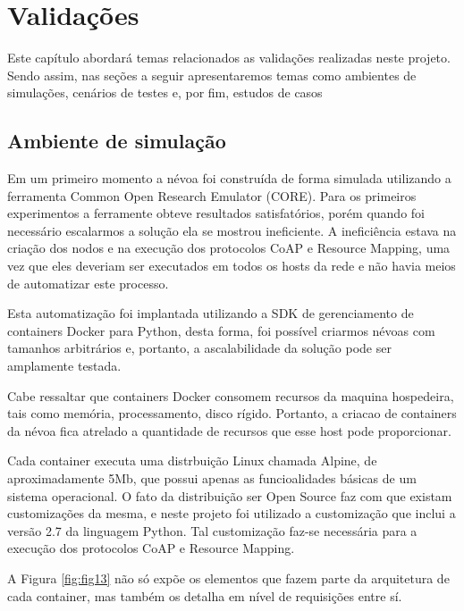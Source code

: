 \chapter{\label{chap:chap4} Validações}

Este capítulo abordará temas relacionados as validações realizadas neste projeto.
Sendo assim, nas seções a seguir apresentaremos temas como ambientes de simulações, cenários de testes e, por fim, estudos de casos


\section{Ambiente de simulação}
Em um primeiro momento a névoa foi construída de forma simulada utilizando a ferramenta Common Open Research Emulator (CORE)\cite{coregui}.
Para os primeiros experimentos a ferramente obteve resultados satisfatórios, porém quando foi necessário escalarmos a solução ela se mostrou ineficiente.
A ineficiência estava na criação dos nodos e na execução dos protocolos CoAP e Resource Mapping, uma vez que eles deveriam ser executados em todos os hosts da rede e não havia 
meios de automatizar este processo.

Esta automatização foi implantada utilizando a SDK de gerenciamento de containers Docker para Python, desta forma, foi possível criarmos névoas com tamanhos arbitrários
e, portanto, a ascalabilidade da solução pode ser amplamente testada\cite{dockersdk:2018}.

Cabe ressaltar que containers Docker\cite{docker:2018} consomem recursos da maquina hospedeira, tais como memória, processamento, disco rígido.
Portanto, a criacao de containers da névoa fica atrelado a quantidade de recursos que esse host pode proporcionar.

Cada container executa uma distrbuição Linux chamada Alpine, de aproximadamente 5Mb, que possui apenas as funcioalidades básicas de um sistema operacional\cite{linuxalpine:2018}.
O fato da distribuição ser Open Source faz com que existam customizações da mesma, e neste projeto foi utilizado a customização que inclui a versão 2.7 da linguagem Python.
Tal customização faz-se necessária para a execução dos protocolos CoAP e Resource Mapping.


A Figura \ref{fig:fig13} não só expõe os elementos que fazem parte da arquitetura de cada container, mas também os detalha em nível de requisições entre sí.



